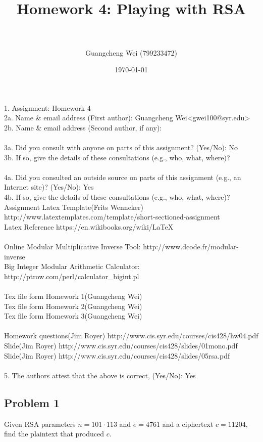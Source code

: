 \documentclass[paper=a4, fontsize=11pt]{scrartcl} %
\title{ 
\horrule{0.5pt} \\[0.4cm] %
\huge Homework 4: Playing with RSA \\ %
\horrule{2pt} \\[0.5cm] %
}
\author{Guangcheng Wei (799233472)} %
\date{\normalsize\today} %
\numberwithin{equation}{section} %
\numberwithin{figure}{section} %
\newcommand{\problem}[1]{\subsection *{Problem #1}}
\begin{document}
\maketitle %

1.  Assignment: Homework 4\\

2a. Name \& email address (First author): Guangcheng Wei<gwei100@syr.edu> \\
2b. Name \& email address (Second author, if any):\\
\\
3a. Did you consult with anyone on parts of this assignment? (Yes/No): No\\
3b. If so, give the details of these consultations (e.g., who, what,    where)?\\
\\
4a. Did you consulted an outside source on parts of this assignment     (e.g., an Internet site)?  (Yes/No): Yes\\
4b. If so, give the details of these consultations (e.g., who, what,     where)?
\\
Assignment Latex Template(Frits Wenneker) http://www.latextemplates.com/template/short-sectioned-assignment\\
Latex Reference https://en.wikibooks.org/wiki/LaTeX\\
\\
Online Modular Multiplicative Inverse Tool: http://www.dcode.fr/modular-inverse\\
Big Integer Modular Arithmetic Calculator: http://ptrow.com/perl/calculator\_bigint.pl\\
\\
Tex file form Homework 1(Guangcheng Wei)\\
Tex file form Homework 2(Guangcheng Wei)\\
Tex file form Homework 3(Guangcheng Wei)\\
\\
Homework questions(Jim Royer) http://www.cis.syr.edu/courses/cis428/hw04.pdf\\
Slide(Jim Royer) http://www.cis.syr.edu/courses/cis428/slides/01mono.pdf\\
Slide(Jim Royer) http://www.cis.syr.edu/courses/cis428/slides/05rsa.pdf\\
\\
5.  The authors attest that the above is correct, (Yes/No): Yes\\

\pagebreak
\problem 1
Given RSA parameters $n = 101 \cdot 113$ and $e = 4761$ and a ciphertext
$c = 11204$, find the plaintext that produced $c$. \\
\end{document}
